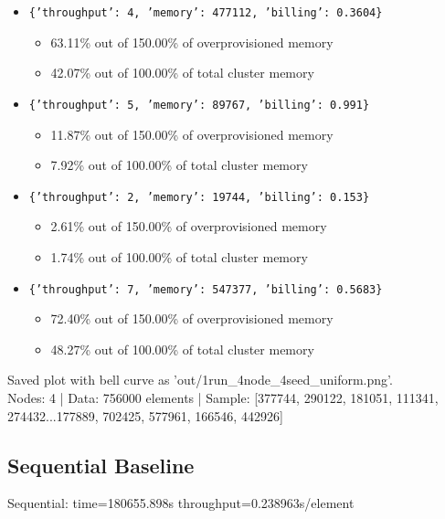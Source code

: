 \documentclass[]{interact}
\theoremstyle{plain}
\theoremstyle{definition}
\theoremstyle{remark}
\begin{document}
\begin{itemize}
    \item \texttt{\{'throughput': 4, 'memory': 477112, 'billing': 0.3604\}}
    \begin{itemize}
        \item 63.11\% out of 150.00\% of overprovisioned memory
        \item 42.07\% out of 100.00\% of total cluster memory
    \end{itemize}
    \item \texttt{\{'throughput': 5, 'memory': 89767, 'billing': 0.991\}}
    \begin{itemize}
        \item 11.87\% out of 150.00\% of overprovisioned memory
        \item 7.92\% out of 100.00\% of total cluster memory
    \end{itemize}
    \item \texttt{\{'throughput': 2, 'memory': 19744, 'billing': 0.153\}}
    \begin{itemize}
        \item 2.61\% out of 150.00\% of overprovisioned memory
        \item 1.74\% out of 100.00\% of total cluster memory
    \end{itemize}
    \item \texttt{\{'throughput': 7, 'memory': 547377, 'billing': 0.5683\}}
    \begin{itemize}
        \item 72.40\% out of 150.00\% of overprovisioned memory
        \item 48.27\% out of 100.00\% of total cluster memory
    \end{itemize}
\end{itemize}

Saved plot with bell curve as 'out/1run\_4node\_4seed\_uniform.png'.\\
Nodes: 4 | Data: 756000 elements | Sample: [377744, 290122, 181051, 111341, 274432...177889, 702425, 577961, 166546, 442926]

\subsection{Sequential Baseline}
Sequential: time=180655.898\textmu s throughput=0.238963\textmu s/element
\end{document}
